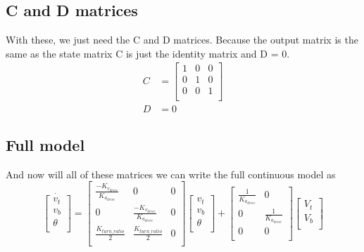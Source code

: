 \documentclass{scrartcl}
\begin{document}
\subsection{C and D matrices}
With these, we just need the C and D matrices.
Because the output matrix is the same as the state matrix C is just the identity matrix and D = 0.
\begin{align}
    C & =
    \begin{bmatrix}
        1 & 0 & 0 \\
        0 & 1 & 0 \\
        0 & 0 & 1 \\
    \end{bmatrix} \\
    D & = 0
\end{align}

\subsection{Full model}
And now will all of these matrices we can write the full continuous model as
\begin{equation}
    \dot{\begin{bmatrix}
            v_t    \\
            v_b    \\
            \theta \\
        \end{bmatrix}} =
    \begin{bmatrix}
        \frac{-K_{v_\mathit{drive}}}{K_{a_\mathit{drive}}} & 0                                                  & 0 \\
        0                                                  & \frac{-K_{v_\mathit{drive}}}{K_{a_\mathit{drive}}} & 0 \\
        \frac{K_\mathit{turn\_ratio}}{2}                   & \frac{K_\mathit{turn\_ratio}}{2}                   & 0 \\
    \end{bmatrix}\begin{bmatrix}
        v_t    \\
        v_b    \\
        \theta \\
    \end{bmatrix} + \begin{bmatrix}
        \frac{1}{K_{a_\mathit{drive}}} & 0                              \\
        0                              & \frac{1}{K_{a_\mathit{drive}}} \\
        0                              & 0                              \\
    \end{bmatrix}\begin{bmatrix}
        V_t \\
        V_b \\
    \end{bmatrix}
\end{equation}
\end{document}
